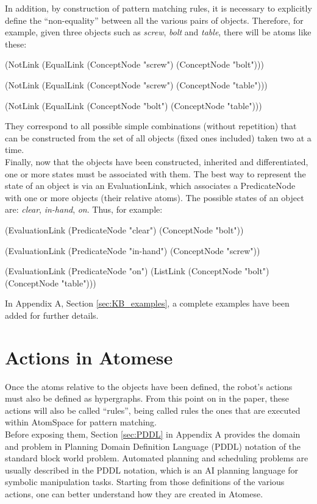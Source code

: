 In addition, by construction of pattern matching rules, it is necessary to explicitly define the \enquote{non-equality} between all the various pairs of objects. Therefore, for example, given three objects such as \textit{screw}, \textit{bolt} and \textit{table}, there will be atoms like these: \\
\begin{python}
	(NotLink (EqualLink 
		(ConceptNode "screw") (ConceptNode "bolt")))

	(NotLink (EqualLink 
		(ConceptNode "screw") (ConceptNode "table")))

	(NotLink (EqualLink 
		(ConceptNode "bolt") (ConceptNode "table")))
\end{python}
They correspond to all possible simple combinations (without repetition) that can be constructed from the set of all objects (fixed ones included) taken two at a time. \\

Finally, now that the objects have been constructed, inherited and differentiated, one or more states must be associated with them. The best way to represent the state of an object is via an EvaluationLink, which associates a PredicateNode with one or more objects (their relative atoms). The possible states of an object are: \textit{clear}, \textit{in-hand}, \textit{on}. Thus, for example: \\
\begin{python}
	(EvaluationLink
		(PredicateNode "clear")
		(ConceptNode "bolt"))
	
	(EvaluationLink
		(PredicateNode "in-hand")
		(ConceptNode "screw"))
	
	(EvaluationLink
		(PredicateNode "on")
		(ListLink
			(ConceptNode "bolt")
			(ConceptNode "table")))
\end{python}

In Appendix A, Section \ref{sec:KB_examples}, a complete examples have been added for further details.

\section{Actions in Atomese}\label{sec:domain_atomese}
Once the atoms relative to the objects have been defined, the robot's actions must also be defined as hypergraphs. 
From this point on in the paper, these actions will also be called \enquote{rules}, being called rules the ones that are executed within AtomSpace for pattern matching. \\
Before exposing them, Section \ref{sec:PDDL} in Appendix A provides the domain and problem in Planning Domain Definition Language (PDDL) notation of the standard block world problem.
Automated planning and scheduling problems are usually described in the PDDL notation, which is an AI planning language for symbolic manipulation tasks.
Starting from those definitions of the various actions, one can better understand how they are created in Atomese. \\

